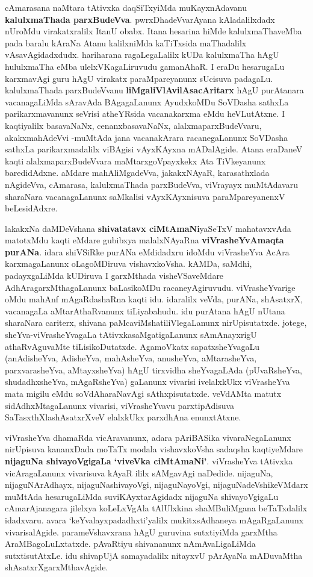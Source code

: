 cAmarasana naMtara tAtivxka daqSiTxyiMda muKayxnAdavanu \textbf{kalulxmaThada parxBudeVva}. pwrxDhadeVvarAyana kAladalilxdadx nUroMdu virakatxralilx ItanU obabx.  Itana hesarina hiMde kalulxmaThaveMba pada baralu kAraNa Atanu kalilxniMda kaTiTxsida maThadalilx vAsavAgidadxdudx. hariharana ragaLegaLalilx kUDa kalulxmaTha hAgU hululxmaTha eMba ulelxVKagaLiruvudu gamanAhaR. I eraDu hesarugaLu karxmavAgi guru hAgU virakatx paraMpareyanunx sUcisuva padagaLu. kalulxmaThada parxBudeVvanu \textbf{liMgaliVlAvilAsacAritarx} hAgU purAtanara vacanagaLiMda sAravAda BAgagaLanunx AyudxkoMDu SoVDasha sathxLa parikarxmavanunx seVrisi atheYRsida vacanakarxma eMdu heVLutAtxne. I kaqtiyalilx basavaNaNx, cenanxbasavaNaNx, alalxmaparxBudeVvaru, akakxmahAdeVvi -muMtAda  jana vacanakArara racanegaLanunx SoVDasha sathxLa parikarxmadalilx viBAgisi vAyxKAyxna mADalAgide. Atana eraDaneV kaqti alalxmaparxBudeVvara maMtarxgoVpayxkekx Ata TiVkeyanunx baredidAdxne. aMdare mahAliMgadeVva, jakakxNAyaR, karasathxlada nAgideVva, cAmarasa, kalulxmaThada parxBudeVva, viVrayayx muMtAdavaru sharaNara vacanagaLanunx saMkalisi vAyxKAyxnisuva paraMpareyanenxV beLesidAdxre.

lakakxNa daMDeVshana \textbf{shivatatavx ciMtAmaNi}yaSeTxV mahatavxvAda matotxMdu kaqti eMdare gubibxya malalxNAyaRna \textbf{viVrasheYvAmaqta purANa}. idara shiVSiRke purANa eMdidadxru idoMdu viVrasheYva AcAra karxmagaLanunx oLagoMDiruva vishavxkoVsha.  kAMDa,  saMdhi,  padayxgaLiMda kUDiruva I garxMthada visheVSaveMdare  AdhAragarxMthagaLanunx baLasikoMDu racaneyAgiruvudu. viVrasheYvarige oMdu mahAnf mAgaRdashaRna kaqti idu. idaralilx veVda, purANa, shAsatxrX, vacanagaLa aMtarAthaRvanunx tiLiyabahudu. idu purAtana hAgU nUtana sharaNara cariterx, shivana paMcaviMshatiliVlegaLanunx nirUpisutatxde. jotege, sheYva-viVrasheYvagaLa tAtivxka\break saMgatigaLanunx sAmAnayxrigU athaRvAguvaMte tiLisikoDutatxde. AgamoVkatx sapatxsheYvagaLu (anAdisheYva, AdisheYva, mahAsheYva, anusheYva, aMtarasheYva, parxvarasheYva, aMtayxsheYva) hAgU tirxvidha sheYvagaLAda (pUvaRsheYva, shudadhxsheYva, mAgaRsheYva) gaLanunx vivarisi ivelalxkUkx viVrasheYva mata migilu eMdu soVdAharaNavAgi sAthxpisutatxde. veVdAMta matutx  sidAdhxMtagaLanunx vivarisi, viVrasheYvavu parxtipAdisuva SaTasxthXlashAsatxrXveV elalxkUkx  parxdhAna enunxtAtxne.

viVrasheYva dhamaRda vicAravanunx, adara pAriBASika vivaraNegaLanunx nirUpisuva kananxDada moTaTx modala vishavxkoVsha sadaqsha kaqtiyeMdare \textbf{nijaguNa shivayoVgigaLa `viveVka ciMtAmaNi'}. viVrasheYva tAtivxka vicAragaLanunx vivarisuva kAyaR ililx sAMgavAgi naDedide. nijaguNa, nijaguNArAdhayx, nijaguNashivayoVgi, nijaguNayoVgi, nijaguNadeVshikeVMdarx muMtAda hesarugaLiMda suviKAyxta\-rAgidadx nijaguNa shivayoVgigaLu cAmarAjanagara jilelxya koLeLxVgAla tAlUlxkina shaMBuliMgana beTaTxdalilx idadxvaru. avara `keYvalayxpadadhxti'yalilx mukitxsAdhaneya mAgaRgaLanunx vivarisalAgide. parameVshavxrana hAgU guruvina sutxtiyiMda garxMtha AraMBagoLuLxtatxde. pAvaRtiyu shivananunx  nAmAvaLigaLiMda sutxtisutAtxLe. idu shivapUjA samayadalilx nitayxvU pArAyaNa mADuvaMtha shAsatxrXgarxMthavAgide.

